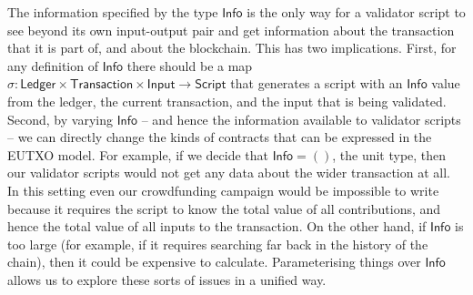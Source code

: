 \documentclass[a4paper]{article}
\newcommand{\todojm}[1]{\todo[inline,color=purple!40,author=Jann]{#1}}
\newcommand{\s}{\textsf}  %
\theoremstyle{definition}  %
\newcommand{\script}{\ensuremath{\s{Script}}}
\newcommand{\info}{\ensuremath{\s{Info}}}
\begin{document}



The information specified by the type $\info$ is the only way for a
validator script to see beyond its own input-output pair and get
information about the transaction that it is part of, and about the
blockchain. This has two implications. First, for any definition of
$\info$ there should be a map $\sigma : \mathsf{Ledger} \times
\mathsf{Transaction} \times \mathsf{Input} \rightarrow
\script$ that generates a script with an \info{} value from the
ledger, the current transaction, and the input that is being
validated. Second, by varying $\info$ -- and hence the information
available to validator scripts -- we can directly change the kinds of
contracts that can be expressed in the EUTXO model. For example, if we
decide that $\info = ()$, the unit type, then our validator scripts would
not get any data about the wider transaction at all. In this setting
even our crowdfunding campaign would be impossible to write because it
requires the script to know the total value of all contributions, and
hence the total value of all inputs to the transaction.  On the other
hand, if $\info$ is too large (for example, if it requires searching far
back in the history of the chain), then it could be expensive to
calculate.  Parameterising things over $\info$ allows us to explore these
sorts of issues in a unified way.
\end{document}
